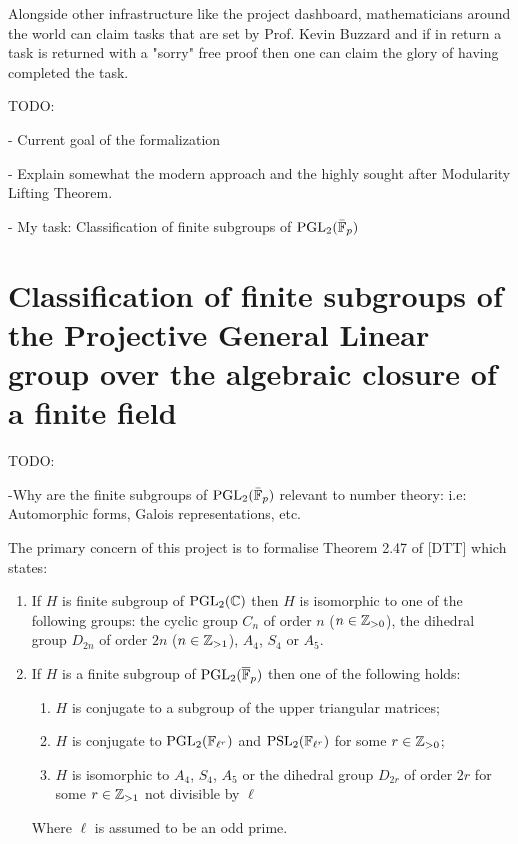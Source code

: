 Alongside other infrastructure like the project dashboard, mathematicians around the world can claim tasks that are set by Prof. Kevin Buzzard and if in return a task is returned with a "sorry" free proof then one can claim the glory of having completed the task.

TODO:

- Current goal of the formalization

- Explain somewhat the modern approach and the highly sought after Modularity Lifting Theorem.

- My task: Classification of finite subgroups of $\textrm{PGL}_2(\bar{\mathbb{F}}_p)$



\section{Classification of finite subgroups of the Projective General Linear group over the algebraic closure of a finite field}

TODO:

-Why are the finite subgroups of  $\textrm{PGL}_2(\bar{\mathbb{F}}_p)$ relevant to number theory: i.e: Automorphic forms, Galois representations, etc.


The primary concern of this project is to formalise Theorem 2.47 of [DTT] which states:

\begin{enumerate}
    \item If $H$ is finite subgroup of $\textrm{PGL}_2(\mathbb{C})$ then $H$ is isomorphic to one of the following groups: the cyclic group $C_n$ of order $n$ ($n \in \mathbb{Z}_{>0}$), the dihedral group $D_{2n}$ of order $2n$ ($n \in \mathbb{Z}_{>1}$), $A_4$, $S_4$ or $A_5$.
\item If $H$ is a finite subgroup of $\textrm{PGL}_2(\overline{\mathbb{F}}_p)$ then one of the following holds:
\begin{enumerate}
    \item $H$ is conjugate to a subgroup of the upper triangular matrices;
    \item $H$ is conjugate to $\textrm{PGL}_2(\mathbb{F}_{\ell^r})$ and $\textrm{PSL}_2(\mathbb{F}_{\ell^{r}})$ for some $r \in \mathbb{Z}_{>0}$;
    \item $H$ is isomorphic to $A_4$, $S_4$, $A_5$ or the dihedral group $D_{2r}$ of order $2r$ for some $r \in \mathbb{Z}_{>1}$ not divisible by $\ell$

\end{enumerate}
    Where $\ell$ is assumed to be an odd prime.
\end{enumerate}


